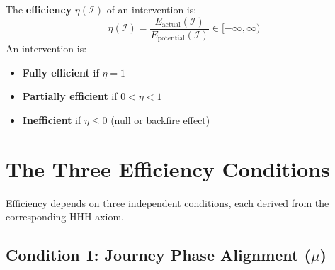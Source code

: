 \begin{definition}
\label{def:efficiency}
The \textbf{efficiency} $\eta(\mathcal{I})$ of an intervention is:
\begin{equation}
\eta(\mathcal{I}) = \frac{E_{\text{actual}}(\mathcal{I})}{E_{\text{potential}}(\mathcal{I})} \in [-\infty, \infty)
\label{eq:efficiency-ratio}
\end{equation}
An intervention is:
\begin{itemize}[nosep]
\item \textbf{Fully efficient} if $\eta = 1$
\item \textbf{Partially efficient} if $0 < \eta < 1$
\item \textbf{Inefficient} if $\eta \leq 0$ (null or backfire effect)
\end{itemize}
\end{definition}


\section{The Three Efficiency Conditions}
\label{sec:eih-conditions}

Efficiency depends on three independent conditions, each derived from the
corresponding HHH axiom.

\subsection{Condition 1: Journey Phase Alignment ($\mu$)}


